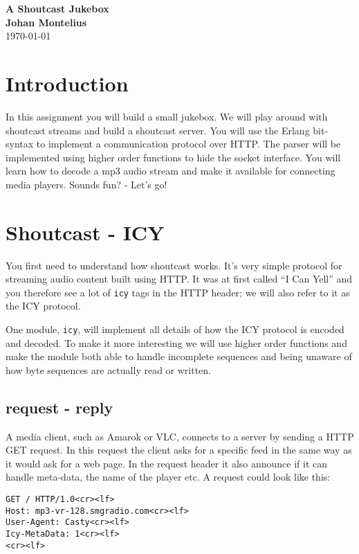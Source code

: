 \documentclass[a4paper,dvips,11pt]{article}
\newcommand{\nnsection}[1]{
\section*{#1}
\addcontentsline{toc}{section}{#1}
}
\begin{document}
\begin{center}
\vspace{20pt}
\textbf{\large A Shoutcast Jukebox }\\
\vspace{10pt}
\textbf{Johan Montelius}\\
\vspace{10pt}
\today{}
\end{center}

\nnsection{Introduction}

In this assignment you will build a small jukebox. We will play around
with shoutcast streams and build a shoutcast server. You will use the
Erlang bit-syntax to implement a communication protocol over HTTP. The
parser will be implemented using higher order functions to hide the
socket interface. You will learn how to decode a mp3 audio stream and
make it available for connecting media players. Sounds fun? - Let's
go!

\section{Shoutcast - ICY}

You first need to understand how shoutcast works. It's very simple
protocol for streaming audio content built using HTTP. It was at first
called ``I Can Yell'' and you therefore see a lot of {\tt icy} tags in
the HTTP header; we will also refer to it as the ICY protocol. 

One module, {\tt icy}, will implement all details of how the ICY
protocol is encoded and decoded. To make it more interesting we will
use higher order functions and make the module both able to handle
incomplete sequences and being unaware of how byte sequences are
actually read or written.

\subsection{request - reply}

A media client, such as Amarok or VLC, connects to a server by sending a HTTP
GET request. In this request the client asks for a specific feed in the
same way as it would ask for a web page. In the request header it also
announce if it can handle meta-data, the name of the player etc. A
request could look like this:


\begin{verbatim}
GET / HTTP/1.0<cr><lf>
Host: mp3-vr-128.smgradio.com<cr><lf>
User-Agent: Casty<cr><lf>
Icy-MetaData: 1<cr><lf>
<cr><lf>
\end{verbatim}
\end{document}
